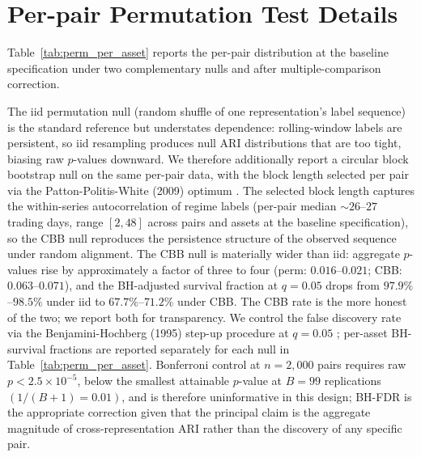 \documentclass[preprint,12pt,authoryear]{elsarticle}
\begin{document}
\section{Per-pair Permutation Test Details}
\label{app:perm_details}

Table~\ref{tab:perm_per_asset} reports the per-pair distribution at the baseline specification under two complementary nulls and after multiple-comparison correction.

The iid permutation null (random shuffle of one representation's label sequence) is the standard reference but understates dependence: rolling-window labels are persistent, so iid resampling produces null ARI distributions that are too tight, biasing raw $p$-values downward. We therefore additionally report a circular block bootstrap null \citep{PolitisRomano1992CBB} on the same per-pair data, with the block length selected per pair via the Patton-Politis-White (2009) optimum \citep{PattonPolitisWhite2009}. The selected block length captures the within-series autocorrelation of regime labels (per-pair median ${\sim}26$--$27$ trading days, range $[2, 48]$ across pairs and assets at the baseline specification), so the CBB null reproduces the persistence structure of the observed sequence under random alignment. The CBB null is materially wider than iid: aggregate $p$-values rise by approximately a factor of three to four (perm: $0.016$--$0.021$; CBB: $0.063$--$0.071$), and the BH-adjusted survival fraction at $q=0.05$ drops from $97.9\%$--$98.5\%$ under iid to $67.7\%$--$71.2\%$ under CBB. The CBB rate is the more honest of the two; we report both for transparency. We control the false discovery rate via the Benjamini-Hochberg (1995) step-up procedure at $q=0.05$ \citep{BenjaminiHochberg1995}; per-asset BH-survival fractions are reported separately for each null in Table~\ref{tab:perm_per_asset}. Bonferroni control at $n=2{,}000$ pairs requires raw $p<2.5\times 10^{-5}$, below the smallest attainable $p$-value at $B=99$ replications $(1/(B+1)=0.01)$, and is therefore uninformative in this design; BH-FDR is the appropriate correction given that the principal claim is the aggregate magnitude of cross-representation ARI rather than the discovery of any specific pair.
\end{document}
